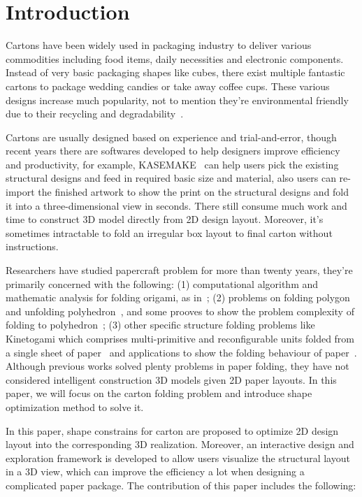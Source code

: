 \section{Introduction}
Cartons have been widely used in packaging industry to deliver various commodities including food items, daily necessities and electronic components. Instead of very basic packaging shapes like cubes, there exist multiple fantastic cartons to package wedding candies or take away coffee cups. These various designs increase much popularity, not to mention they're environmental friendly due to their recycling and degradability~\cite{Mullineux:2010:CSC:1739328.1739673}.

Cartons are usually designed based on experience and trial-and-error, though recent years there are softwares developed to help designers improve efficiency and productivity, for example, KASEMAKE~\cite{KASEMAKE} can help users pick the existing structural designs and feed in required basic size and material, also users can re-import the finished artwork to show the print on the structural designs and fold it into a three-dimensional view in seconds. There still consume much work and time to construct 3D model directly from 2D design layout. Moreover, it's sometimes intractable to fold an irregular box layout to final carton without instructions.

Researchers have studied papercraft problem for more than twenty years, they're primarily concerned with the following: (1) computational algorithm and mathematic analysis for folding origami, as in~\cite{Ida:2007:MOC:1802954.1803021,Lang:1996:CAO:237218.237249,xl-idetc-14}; (2) problems on folding polygon and unfolding polyhedron~\cite{Bern:2003:UPC:636968.636970,O'Rourke:1998:FUC:646319.686376,Rourke2008Unfolding}, and some prooves to show the problem complexity of folding to polyhedron~\cite{Biedl:2005:NFP:1090462.1646553,Biedl2004When,Lubiw1996When}; (3) other specific structure folding problems like Kinetogami which comprises multi-primitive and reconfigurable units folded from a single sheet of paper~\cite{Gao2013Kinetogami} and applications to show the folding behaviour of paper~\cite{Thiel1998,Kishi:1998:OFP:786112.786279,Nimnual2007Virtual,Shimanuki2009Construction}. Although previous works solved plenty problems in paper folding, they have not considered intelligent construction 3D models given 2D paper layouts. In this paper, we will focus on the carton folding problem and introduce shape optimization method to solve it.

In this paper, shape constrains for carton are proposed to optimize 2D design layout into the corresponding 3D realization. Moreover, an interactive design and exploration framework is developed to allow users visualize the structural layout in a 3D view, which can improve the efficiency a lot when designing a complicated paper package. The contribution of this paper includes the following:

